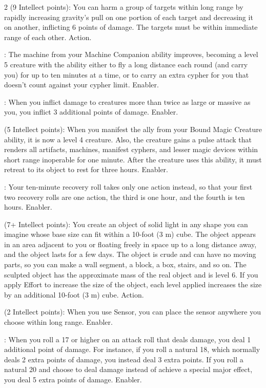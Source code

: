 \begin{multicols}{2}
 (9 Intellect points): You can harm a group of targets within long range by rapidly increasing gravity’s pull on one portion of each target and decreasing it on another, inflicting 6 points of damage. The targets must be within immediate range of each other. Action. 
 
: The machine from your Machine Companion ability improves, becoming a level 5 creature with the ability either to fly a long distance each round (and carry you) for up to ten minutes at a time, or to carry an extra cypher for you that doesn’t count against your cypher limit. Enabler. 
 
: When you inflict damage to creatures more than twice as large or massive as you, you inflict 3 additional points of damage. Enabler. 
 
 (5 Intellect points): When you manifest the ally from your Bound Magic Creature ability, it is now a level 4 creature. Also, the creature gains a pulse attack that renders all artifacts, machines, manifest cyphers, and lesser magic devices within short range inoperable for one minute. After the creature uses this ability, it must retreat to its object to rest for three hours. Enabler. 
 
: Your ten-minute recovery roll takes only one action instead, so that your first two recovery rolls are one action, the third is one hour, and the fourth is ten hours. Enabler. 
 
 (7+ Intellect points): You create an object of solid light in any shape you can imagine whose base size can fit within a 10-foot (3 m) cube. The object appears in an area adjacent to you or floating freely in space up to a long distance away, and the object lasts for a few days. The object is crude and can have no moving parts, so you can make a wall segment, a block, a box, stairs, and so on. The sculpted object has the approximate mass of the real object and is level 6. If you apply Effort to increase the size of the object, each level applied increases the size by an additional 10-foot (3 m) cube. Action. 
 
 (2 Intellect points): When you use Sensor, you can place the sensor anywhere you choose within long range. Enabler. 
 
: When you roll a 17 or higher on an attack roll that deals damage, you deal 1 additional point of damage. For instance, if you roll a natural 18, which normally deals 2 extra points of damage, you instead deal 3 extra points. If you roll a natural 20 and choose to deal damage instead of achieve a special major effect, you deal 5 extra points of damage. Enabler. 
 

\end{multicols}

